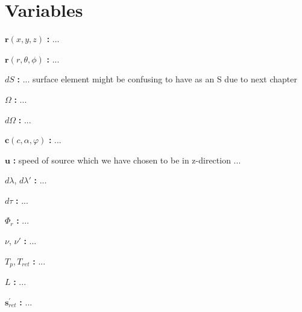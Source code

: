 \section{Variables}

\noindent ${\mathbf{r}}(x,y,z)$ \textbf{:}
...

\noindent ${\mathbf{r}}(r,{\theta},{\phi})$ \textbf{:}
...

\noindent ${dS}$ \textbf{:}
... surface element might be confusing to have as an S due to next chapter

\noindent ${\Omega}$ \textbf{:}
...

\noindent ${d\Omega}$ \textbf{:}
...

\noindent ${\mathbf{c}}(c,\alpha,\varphi)$ \textbf{:}
...

\noindent ${\mathbf{u}}$ \textbf{:}
speed of source which we have chosen to be in z-direction ...

\noindent ${d\lambda}$, ${d\lambda{'}}$ \textbf{:}
...

\noindent ${d\tau}$ \textbf{:}
...

\noindent ${\Phi_{r}}$ \textbf{:}
...

\noindent ${\nu}$, ${\nu{'}}$ \textbf{:}
...

\noindent $T_p,T_{ret}$ \textbf{:}
...

\noindent $L$ \textbf{:}
...

\noindent $\mathbf{s}_{ret}^{'}$ \textbf{:}
...